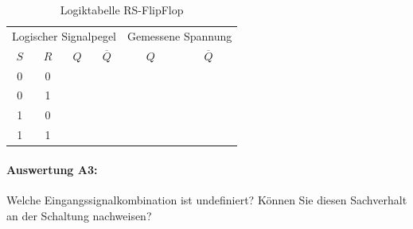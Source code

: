 \documentclass[11pt,a4paper,titlepage,parskip=half]{scrreprt}
\begin{document}
          \begin{center}
              \begin{table}[H]
                  \caption{Logiktabelle RS-FlipFlop}
                  \renewcommand{\arraystretch}{1.6}
                  \begin{center}
                      \begin{tabular}{c|c|c|c|c|c}
                          \multicolumn{4}{c|}{Logischer Signalpegel} &\multicolumn{2}{c}{Gemessene Spannung}\\
                          $S$ & $R$ & $Q$ & $\overline{Q}$ & $Q$ & $\overline{Q}$\\ \hline
                          0&0 & \qquad\qquad\qquad & \qquad\qquad\qquad & \qquad\qquad\qquad & \qquad\qquad\qquad\\\hline
                          0 & 1 &  &  &  & \\\hline
                          1 & 0 & &  &  & \\\hline
                          1 & 1 & & &  & 
                      \end{tabular}
                  \end{center}
              \end{table}
          \end{center}
        \paragraph{Auswertung A3:} Welche Eingangssignalkombination ist undefiniert? Können Sie diesen Sachverhalt an
          der Schaltung nachweisen?
\end{document}

